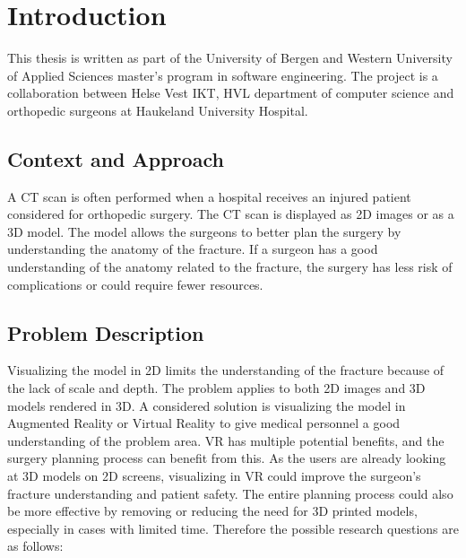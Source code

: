 \documentclass[a4paper]{report}
\begin{document}

\pagebreak
\tableofcontents
\listoffigures


\chapter{Introduction}
This thesis is written as part of the University of Bergen and Western University of Applied Sciences master's program in software engineering. The project is a collaboration between Helse Vest IKT, HVL department of computer science and orthopedic surgeons at Haukeland University Hospital.

\section{Context and Approach}
A CT scan is often performed when a hospital receives an injured patient considered for orthopedic surgery. The CT scan is displayed as 2D images or as a 3D model. The model allows the surgeons to better plan the surgery by understanding the anatomy of the fracture.
If a surgeon has a good understanding of the anatomy related to the fracture,
the surgery has less risk of complications or could require fewer resources.

\section{Problem Description}
Visualizing the model in 2D limits the understanding of the fracture because of the lack of scale and depth. The problem applies to both 2D images and 3D models rendered in 3D.
A considered solution is visualizing the model in Augmented Reality or Virtual Reality to give medical personnel a good understanding of the problem area.
VR has multiple potential benefits, and the surgery planning process can benefit from this. As the users are already looking at 3D models on 2D screens, visualizing in VR could improve the surgeon's fracture understanding and patient safety. The entire planning process could also be more effective by removing or reducing the need for 3D printed models, especially in cases with limited time.
Therefore the possible research questions are as follows:
\end{document}
